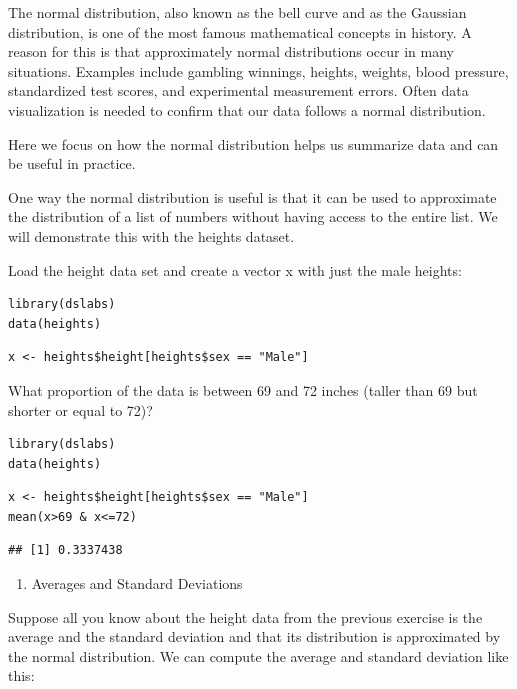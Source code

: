 \documentclass[
]{article}
\providecommand{\tightlist}{%
  \setlength{\itemsep}{0pt}\setlength{\parskip}{0pt}}
\begin{document}
The normal distribution, also known as the bell curve and as the
Gaussian distribution, is one of the most famous mathematical concepts
in history. A reason for this is that approximately normal distributions
occur in many situations. Examples include gambling winnings, heights,
weights, blood pressure, standardized test scores, and experimental
measurement errors. Often data visualization is needed to confirm that
our data follows a normal distribution.

Here we focus on how the normal distribution helps us summarize data and
can be useful in practice.

One way the normal distribution is useful is that it can be used to
approximate the distribution of a list of numbers without having access
to the entire list. We will demonstrate this with the heights dataset.

Load the height data set and create a vector x with just the male
heights:

\begin{verbatim}
library(dslabs)  
data(heights)  
\end{verbatim}

\begin{verbatim}
x <- heights$height[heights$sex == "Male"]  
\end{verbatim}

What proportion of the data is between 69 and 72 inches (taller than 69
but shorter or equal to 72)?

\begin{verbatim}
library(dslabs)
data(heights)
\end{verbatim}

\begin{verbatim}
x <- heights$height[heights$sex == "Male"]
mean(x>69 & x<=72)
\end{verbatim}

\begin{verbatim}
## [1] 0.3337438
\end{verbatim}

\begin{enumerate}
\def\labelenumi{\arabic{enumi}.}
\setcounter{enumi}{1}
\tightlist
\item
  Averages and Standard Deviations
\end{enumerate}

Suppose all you know about the height data from the previous exercise is
the average and the standard deviation and that its distribution is
approximated by the normal distribution. We can compute the average and
standard deviation like this:
\end{document}
